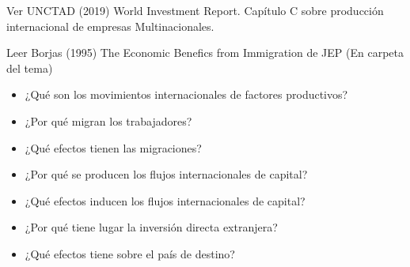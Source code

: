 \documentclass{nuevotema}
\begin{document}
\ideaclave

Ver UNCTAD (2019) World Investment Report. Capítulo C sobre producción internacional de empresas Multinacionales. 

Leer Borjas (1995) The Economic Benefics from Immigration de JEP (En carpeta del tema)


\begin{itemize}
	\item ¿Qué son los movimientos internacionales de factores productivos?
	\item ¿Por qué migran los trabajadores?
	\item ¿Qué efectos tienen las migraciones?
	\item ¿Por qué se producen los flujos internacionales de capital?
	\item ¿Qué efectos inducen los flujos internacionales de capital?
	\item ¿Por qué tiene lugar la inversión directa extranjera?
	\item ¿Qué efectos tiene sobre el país de destino?
\end{itemize}

\esquemacorto
\end{document}
